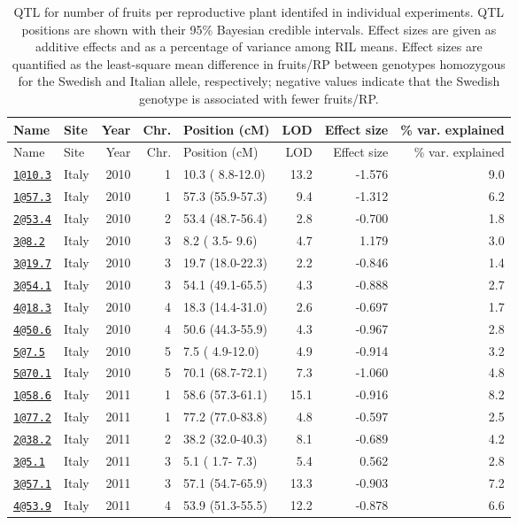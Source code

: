\documentclass[]{article}
\begin{document}
\begin{longtable}[]{@{}llrrlrrr@{}}
\caption{\label{tab:individual-frut-qtl}QTL for number of fruits per reproductive plant identifed in individual experiments. QTL positions are shown with their 95\% Bayesian credible intervals. Effect sizes are given as additive effects and as a percentage of variance among RIL means. Effect sizes are quantified as the least-square mean difference in fruits/RP between genotypes homozygous for the Swedish and Italian allele, respectively; negative values indicate that the Swedish genotype is associated with fewer fruits/RP.}\tabularnewline
\toprule
Name & Site & Year & Chr. & Position (cM) & LOD & Effect size & \% var. explained\tabularnewline
\midrule
\endfirsthead
\toprule
Name & Site & Year & Chr. & Position (cM) & LOD & Effect size & \% var. explained\tabularnewline
\midrule
\endhead
\href{mailto:1@10.3}{\nolinkurl{1@10.3}} & Italy & 2010 & 1 & 10.3 ( 8.8-12.0) & 13.2 & -1.576 & 9.0\tabularnewline
\href{mailto:1@57.3}{\nolinkurl{1@57.3}} & Italy & 2010 & 1 & 57.3 (55.9-57.3) & 9.4 & -1.312 & 6.2\tabularnewline
\href{mailto:2@53.4}{\nolinkurl{2@53.4}} & Italy & 2010 & 2 & 53.4 (48.7-56.4) & 2.8 & -0.700 & 1.8\tabularnewline
\href{mailto:3@8.2}{\nolinkurl{3@8.2}} & Italy & 2010 & 3 & 8.2 ( 3.5- 9.6) & 4.7 & 1.179 & 3.0\tabularnewline
\href{mailto:3@19.7}{\nolinkurl{3@19.7}} & Italy & 2010 & 3 & 19.7 (18.0-22.3) & 2.2 & -0.846 & 1.4\tabularnewline
\href{mailto:3@54.1}{\nolinkurl{3@54.1}} & Italy & 2010 & 3 & 54.1 (49.1-65.5) & 4.3 & -0.888 & 2.7\tabularnewline
\href{mailto:4@18.3}{\nolinkurl{4@18.3}} & Italy & 2010 & 4 & 18.3 (14.4-31.0) & 2.6 & -0.697 & 1.7\tabularnewline
\href{mailto:4@50.6}{\nolinkurl{4@50.6}} & Italy & 2010 & 4 & 50.6 (44.3-55.9) & 4.3 & -0.967 & 2.8\tabularnewline
\href{mailto:5@7.5}{\nolinkurl{5@7.5}} & Italy & 2010 & 5 & 7.5 ( 4.9-12.0) & 4.9 & -0.914 & 3.2\tabularnewline
\href{mailto:5@70.1}{\nolinkurl{5@70.1}} & Italy & 2010 & 5 & 70.1 (68.7-72.1) & 7.3 & -1.060 & 4.8\tabularnewline
\href{mailto:1@58.6}{\nolinkurl{1@58.6}} & Italy & 2011 & 1 & 58.6 (57.3-61.1) & 15.1 & -0.916 & 8.2\tabularnewline
\href{mailto:1@77.2}{\nolinkurl{1@77.2}} & Italy & 2011 & 1 & 77.2 (77.0-83.8) & 4.8 & -0.597 & 2.5\tabularnewline
\href{mailto:2@38.2}{\nolinkurl{2@38.2}} & Italy & 2011 & 2 & 38.2 (32.0-40.3) & 8.1 & -0.689 & 4.2\tabularnewline
\href{mailto:3@5.1}{\nolinkurl{3@5.1}} & Italy & 2011 & 3 & 5.1 ( 1.7- 7.3) & 5.4 & 0.562 & 2.8\tabularnewline
\href{mailto:3@57.1}{\nolinkurl{3@57.1}} & Italy & 2011 & 3 & 57.1 (54.7-65.9) & 13.3 & -0.903 & 7.2\tabularnewline
\href{mailto:4@53.9}{\nolinkurl{4@53.9}} & Italy & 2011 & 4 & 53.9 (51.3-55.5) & 12.2 & -0.878 & 6.6\tabularnewline

\end{longtable}
\end{document}
